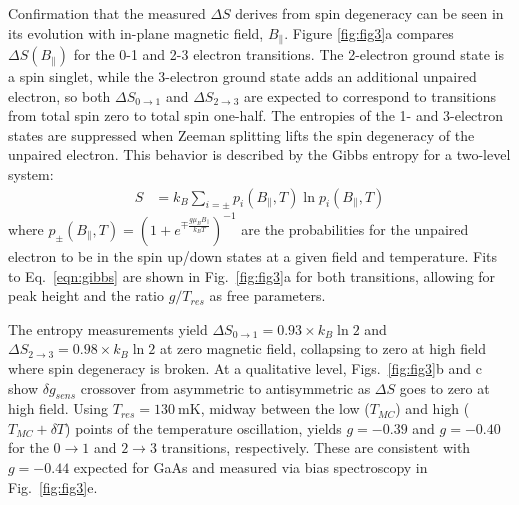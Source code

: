 \documentclass[twocolumn,showpacs,amsmath,amssymb,prl,aps,superscriptaddress]{revtex4-1}
\begin{document}
Confirmation that the measured $\Delta S$ derives from spin degeneracy can be seen in its evolution with in-plane magnetic field, $B_\parallel$. Figure \ref{fig:fig3}a compares $\Delta S(B_\parallel)$ for the 0-1 and 2-3 electron transitions.  The 2-electron ground state is a spin singlet, while the 3-electron ground state adds an additional unpaired electron, so both $\Delta S_{0 \rightarrow 1}$ and $\Delta S_{2 \rightarrow 3}$ are expected to correspond to transitions from total spin zero to total spin one-half.
The entropies of the 1- and 3-electron states are suppressed when Zeeman splitting lifts the spin degeneracy of the unpaired electron. This behavior is described by the Gibbs entropy for a two-level system:
%
\begin{align}
\label{eqn:gibbs}
        S &= k_B \sum_{i=\pm} p_{i}(B_\parallel, T) \ln{ p_{i}(B_\parallel,T) }
\end{align}
%
where $p_{\pm}(B_\parallel, T) = (1+ e^{\mp \frac{g\mu_B B_{\parallel}}{k_B T}})^{-1}$ are the probabilities for the unpaired electron to be in the spin up/down states at a given field and temperature. Fits to Eq.~\ref{eqn:gibbs} are shown in Fig.~\ref{fig:fig3}a for both transitions, allowing for peak height and the ratio $g/T_{res}$ as free parameters.

The entropy measurements yield $\Delta S_{0 \rightarrow 1}=0.93\times k_B \ln{2}$ and $\Delta S_{2 \rightarrow 3}=0.98\times k_B \ln{2}$ at zero magnetic field, collapsing to zero at high field where spin degeneracy is broken.  At a qualitative level, Figs.~\ref{fig:fig3}b and c show $\delta g_{sens}$ crossover from asymmetric to antisymmetric as $\Delta S$ goes to zero at high field. Using $T_{res} = \SI{130}{\milli\kelvin}$, midway between the low ($T_{MC}$) and high ($T_{MC}+\delta T$) points of the temperature oscillation, yields $g=-0.39$ and $g=-0.40$ for the $0\rightarrow 1$ and $2\rightarrow 3$ transitions, respectively. These are consistent with $g=-0.44$ expected for GaAs and measured via bias spectroscopy in Fig.~\ref{fig:fig3}e.
\end{document}
